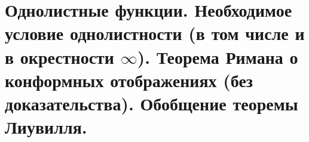 \section{Однолистные функции. Необходимое условие однолистности (в том числе и в окрестности $\infty$). Теорема Римана о конформных отображениях (без доказательства). Обобщение теоремы Лиувилля.}

\newpage

